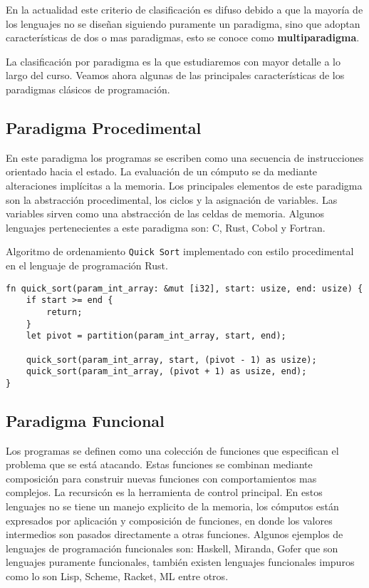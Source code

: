\documentclass[12pt]{extarticle}
\begin{document}
\begin{description}
    En la actualidad este criterio de clasificación es difuso debido a que la mayoría de los lenguajes no se diseñan siguiendo puramente un paradigma, sino que adoptan características de dos o mas paradigmas, esto se conoce como {\bf multiparadigma}.
\end{description}

La clasificación por paradigma es la que estudiaremos con mayor detalle a lo largo del curso. Veamos ahora algunas de las principales características de los paradigmas clásicos de programación.

\subsection{Paradigma Procedimental}

En este paradigma los programas se escriben como una secuencia de instrucciones orientado hacia el estado. La evaluación de un cómputo se da mediante alteraciones implícitas a la memoria. Los principales elementos de este paradigma son la abstracción procedimental, los ciclos y la asignación de variables. Las variables sirven como una abstracción de las celdas de memoria. Algunos lenguajes pertenecientes a este paradigma son: {\sf C}, {\sf Rust}, {\sf Cobol} y {\sf Fortran}. 
\begin{example}
Algoritmo de ordenamiento {\tt Quick Sort} implementado con estilo procedimental en el lenguaje de programación {\sf Rust}.
    \begin{code2}
    \begin{verbatim}
fn quick_sort(param_int_array: &mut [i32], start: usize, end: usize) {
    if start >= end {
        return;
    }
    let pivot = partition(param_int_array, start, end);
 
    quick_sort(param_int_array, start, (pivot - 1) as usize);
    quick_sort(param_int_array, (pivot + 1) as usize, end);
}
    \end{verbatim}
    \end{code2}
\end{example}

\subsection{Paradigma Funcional}

Los programas se definen como una colección de funciones que especifican el problema que se está atacando. Estas funciones se combinan mediante composición para construir nuevas funciones con comportamientos mas complejos. La recursicón es la herramienta de control principal. En estos lenguajes no se tiene un manejo explicito de la memoria, los cómputos están expresados por aplicación y composición de funciones, en donde los valores intermedios son pasados directamente a otras funciones. Algunos ejemplos de lenguajes de programación funcionales son: {\sf Haskell}, {\sf Miranda}, {\sf Gofer} que son lenguajes puramente funcionales, también existen lenguajes funcionales impuros como lo son {\sf Lisp}, {\sf Scheme}, {\sf Racket}, {\sf ML} entre otros.
\end{document}
